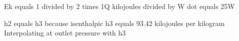 Ek equals 1 divided by 2 times 1Q kilojoules divided by W dot equals 25W  

h2 equals h3 because isenthalpic  
h3 equals 93.42 kilojoules per kilogram  
Interpolating at outlet pressure with h3